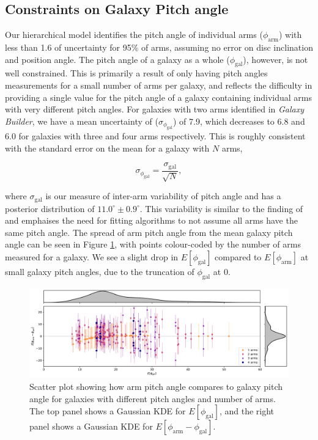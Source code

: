 \subsection{Constraints on Galaxy Pitch angle}
Our hierarchical model identifies the pitch angle of individual arms ($\phi_\mathrm{arm}$) with less than {1.6\degree} of uncertainty for 95\% of arms, assuming no error on disc inclination and position angle. The pitch angle of a galaxy as a whole ($\phi_\mathrm{gal}$), however, is not well constrained. This is primarily a result of only having pitch angles measurements for a small number of arms per galaxy, and reflects the difficulty in providing a single value for the pitch angle of a galaxy containing individual arms with very different pitch angles. For galaxies with two arms identified in \textit{Galaxy Builder}, we have a mean uncertainty of ($\sigma_{\phi_\mathrm{gal}}$) of  {7.9\degree}, which decreases to {6.8\degree} and {6.0\degree} for galaxies with three and four arms respectively. This is roughly consistent with the standard error on the mean for a galaxy with $N$ arms,

\begin{equation}
  \sigma_{\phi_\mathrm{gal}} = \frac{\sigma_\mathrm{gal}}{\sqrt{N}},
\end{equation}

where $\sigma_\mathrm{gal}$ is our measure of inter-arm variability of pitch angle and has a posterior distribution of $11.0^\circ\pm 0.9^\circ$. This variability is similar to the finding of \citet{2014ApJ...790...87D} and emphaises the need for fitting algorithms to not assume all arms have the same pitch angle. The spread of arm pitch angle from the mean galaxy pitch angle can be seen in Figure \ref{fig:arm-pa-spread}, with points colour-coded by the number of arms measured for a galaxy. We see a slight drop in $E[\phi_\mathrm{gal}]$ compared to $E[\phi_\mathrm{arm}]$ at small galaxy pitch angles, due to the truncation of $\phi_\mathrm{gal}$ at {0\degree}.

\begin{figure}
  \includegraphics[width=17.7cm]{plots/arm_pa_spread.pdf}
  \caption{Scatter plot showing how arm pitch angle compares to galaxy pitch angle for galaxies with different pitch angles and number of arms. The top panel shows a Gaussian KDE for $E[\phi_\mathrm{gal}]$, and the right panel shows a Gaussian KDE for $E[\phi_\mathrm{arm} - \phi_\mathrm{gal}]$.}
  \label{fig:arm-pa-spread}
\end{figure}

